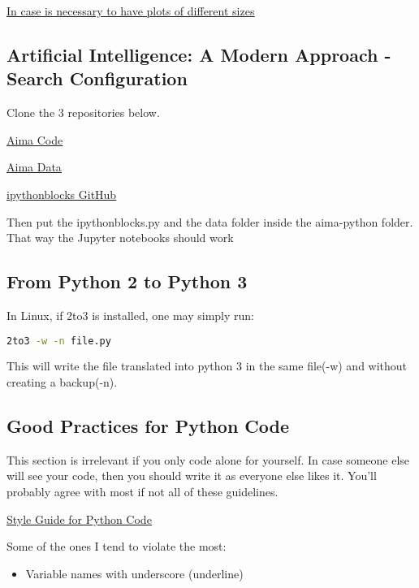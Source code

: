 \href{https://stackoverflow.com/questions/10388462/matplotlib-different-size-subplots}{\ul{In case is necessary to have plots of different sizes}}












\subsection{Artificial Intelligence: A Modern Approach - Search Configuration}

Clone the 3 repositories below.

\href{https://github.com/aimacode/aima-python}{\ul{Aima Code}}

\href{https://github.com/aimacode/aima-data/tree/f6cbea61ad0c21c6b7be826d17af5a8d3a7c2c86}{\ul{Aima Data}}

\href{https://github.com/jiffyclub/ipythonblocks/blob/master/ipythonblocks/ipythonblocks.py}{\ul{ipythonblocks GitHub}}

Then put the ipythonblocks.py and the data folder inside the aima-python folder. That way the Jupyter notebooks should work

\subsection{From Python 2 to Python 3}
In Linux, if 2to3 is installed, one may simply run:
\begin{lstlisting}[language=bash]
    2to3 -w -n file.py    
\end{lstlisting}
This will write the file translated into python 3 in the same file(-w) and without creating a backup(-n).


\subsection{Good Practices for Python Code}

This section is irrelevant if you only code alone for yourself. In case someone else will see your code, then you should write it as everyone else likes it. You'll probably agree with most if not all of these guidelines.

\href{https://www.python.org/dev/peps/pep-0008/}{\ul{Style Guide for Python Code}}

Some of the ones I tend to violate the most:
\begin{itemize}
    \item Variable names with underscore (underline)
\end{itemize}
